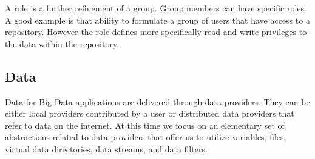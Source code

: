 \documentclass[10pt]{article}
\begin{document}

A role is a further refinement of a group. Group members can have
specific roles. A good example is that ability to formulate a group of
users that have access to a repository. However the role defines more
specifically read and write privileges to the data within the repository.


\subsection{Data}

Data for Big Data applications are delivered through data
providers. They can be either local providers contributed by a user or
distributed data providers that refer to data on the internet. At this
time we focus on an elementary set of abstractions related to data
providers that offer us to utilize variables, files, virtual data
directories, data streams, and data filters.
\end{document}
